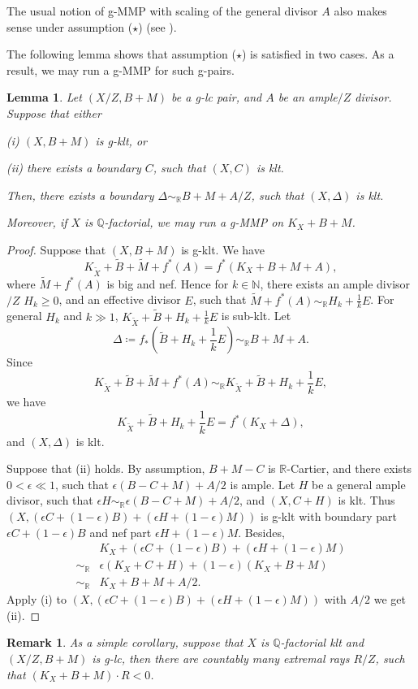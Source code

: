 \documentclass[11pt]{amsart}
\newcommand{\Rr}{\mathbb{R}}
\newcommand{\Qq}{\mathbb{Q}}
\newcommand{\Nn}{\mathbb{N}}
\newtheorem{lemma}[theorem]{Lemma}
\newtheorem{remark}[theorem]{Remark}
\begin{document}
The usual notion of g-MMP with scaling of the general divisor $A$ also makes sense under assumption ($\star$) (see \cite{BZ16}).


The following lemma shows that assumption ($\star$) is satisfied in two cases. As a result, we may run a g-MMP for such g-pairs.

\begin{lemma}\label{lem:glcklt}
	Let $(X/Z,B+M)$ be a g-lc pair, and $A$ be an ample$/Z$ divisor. Suppose that either 
	
	(i) $(X, B+M)$ is g-klt, or
	
	(ii) there exists a boundary $C$, such that $(X,C)$ is klt.
	
	Then, there exists a boundary $\Delta \sim_\Rr B+M+A/Z$, such that $(X,\Delta)$ is klt. 
	
	Moreover, if $X$ is $\Qq$-factorial, we may run a g-MMP on $K_X+B+M$.
\end{lemma}

\begin{proof}
	Suppose that $(X, B+M)$ is g-klt. We have
	\[
	K_{\tilde X}+\tilde B+\tilde M+f^*(A) =f^*(K_{X}+B+M+A),
	\] 
	where $\tilde M+f^*(A)$ is big and nef. Hence for $k \in \Nn$, there exists an ample divisor$/Z$ $H_k\ge0$, and an effective divisor $E$, such that $\tilde{M}+f^*(A)\sim_\Rr H_k+\frac {1}{k}E$. For general $H_k$ and $k \gg 1$, $K_{\tilde X}+\tilde B+H_k+\frac{1}{k}E$ is sub-klt.
	 Let 
	\[
	\Delta\coloneqq f_*(\tilde B+H_k+\frac 1 k E)\sim_\Rr B+M+A.
	\] 
	Since 
	\[
	K_{\tilde X}+\tilde B+\tilde M+f^*(A) \sim_\Rr K_{\tilde X}+\tilde B+H_k+\frac{1}{k}E,
	\] 
	we have 
	\[
	K_{\tilde X}+\tilde B+H_k+\frac{1}{k}E = f^*(K_{X}+\Delta),
	\] and $(X,\Delta)$ is klt. 
	
	Suppose that (ii) holds. By assumption, $B+M-C$ is $\Rr$-Cartier, and there exists $0<\epsilon\ll1$, such that $\epsilon(B-C+M)+A/2$ is ample. Let $H$ be a general ample divisor, such that $\epsilon H\sim_{\Rr}\epsilon(B-C+M)+A/2$, and $(X,C+H)$ is klt. Thus $(X, (\epsilon C+(1-\epsilon) B)+(\epsilon H+(1-\epsilon)M))$ is g-klt with boundary part $\epsilon C+(1-\epsilon) B$ and nef part $\epsilon H+(1-\epsilon)M$. Besides,
	\begin{align*}
	&K_X+(\epsilon C+(1-\epsilon) B)+(\epsilon H+(1-\epsilon)M)\\
	\sim_{\Rr}&\epsilon(K_X+C+H)+(1-\epsilon)(K_X+B+M)\\
	\sim_{\Rr}&K_X+B+M+A/2.	
	\end{align*}
	Apply (i) to $(X, (\epsilon C+(1-\epsilon) B)+(\epsilon H+(1-\epsilon)M))$ with $A/2$ we get (ii).
\end{proof}
\begin{remark}
	As a simple corollary, suppose that $X$ is $\Qq$-factorial klt and $(X/Z,B+M)$ is g-lc, then there are countably many extremal rays $R/Z$, such that $(K_X+B+M)\cdot R<0$. 
\end{remark}
\end{document}
